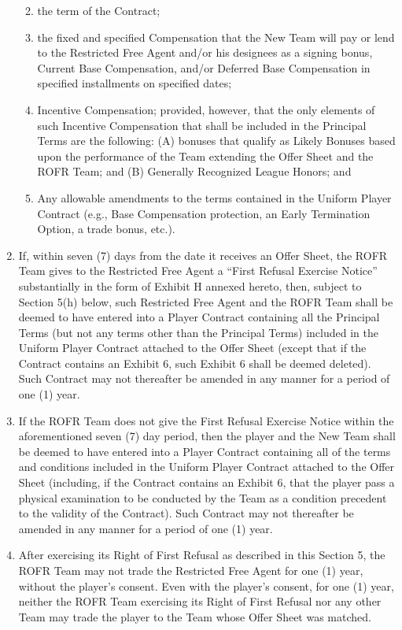 \documentclass[
]{book}
\providecommand{\tightlist}{%
  \setlength{\itemsep}{0pt}\setlength{\parskip}{0pt}}
\begin{document}
\begin{enumerate}
  \begin{enumerate}
  \def\labelenumii{(\roman{enumii})}
  \tightlist
  \item
    the term of the Contract;
  \item
    the fixed and specified Compensation that the New Team will pay or lend to the Restricted Free Agent and/or his designees as a signing bonus, Current Base Compensation, and/or Deferred Base Compensation in specified installments on specified dates;
  \item
    Incentive Compensation; provided, however, that the only elements of such Incentive Compensation that shall be included in the Principal Terms are the following: (A) bonuses that qualify as Likely Bonuses based upon the performance of the Team extending the Offer Sheet and the ROFR Team; and (B) Generally Recognized League Honors; and
  \item
    Any allowable amendments to the terms contained in the Uniform Player Contract (e.g., Base Compensation protection, an Early Termination Option, a trade bonus, etc.).
  \end{enumerate}
\item
  If, within seven (7) days from the date it receives an Offer Sheet, the ROFR Team gives to the Restricted Free Agent a ``First Refusal Exercise Notice'' substantially in the form of Exhibit H annexed hereto, then, subject to Section 5(h) below, such Restricted Free Agent and the ROFR Team shall be deemed to have entered into a Player Contract containing all the Principal Terms (but not any terms other than the Principal Terms) included in the Uniform Player Contract attached to the Offer Sheet (except that if the Contract contains an Exhibit 6, such Exhibit 6 shall be deemed deleted). Such Contract may not thereafter be amended in any manner for a period of one (1) year.
\item
  If the ROFR Team does not give the First Refusal Exercise Notice within the aforementioned seven (7) day period, then the player and the New Team shall be deemed to have entered into a Player Contract containing all of the terms and conditions included in the Uniform Player Contract attached to the Offer Sheet (including, if the Contract contains an Exhibit 6, that the player pass a physical examination to be conducted by the Team as a condition precedent to the validity of the Contract). Such Contract may not thereafter be amended in any manner for a period of one (1) year.
\item
  After exercising its Right of First Refusal as described in this Section 5, the ROFR Team may not trade the Restricted Free Agent for one (1) year, without the player's consent. Even with the player's consent, for one (1) year, neither the ROFR Team exercising its Right of First Refusal nor any other Team may trade the player to the Team whose Offer Sheet was matched.

\end{enumerate}
\end{document}
